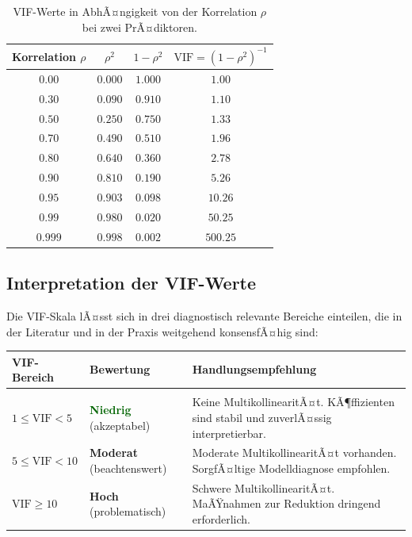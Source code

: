 ﻿\documentclass[12pt, a4paper]{article}
\theoremstyle{definition}
\theoremstyle{remark}
\begin{document}
\begin{table}[H]
	\centering
	\caption{VIF-Werte in AbhÃ¤ngigkeit von der Korrelation $\rho$ bei zwei PrÃ¤diktoren.}
	\label{tab:vif_rho}
	\begin{tabular}{cccc}
		\toprule
		Korrelation $\rho$ & $\rho^2$ & $1 - \rho^2$ & $\mathrm{VIF} = (1-\rho^2)^{-1}$ \\
		\midrule
		$0.00$ & $0.000$ & $1.000$ & $1.00$ \\
		$0.30$ & $0.090$ & $0.910$ & $1.10$ \\
		$0.50$ & $0.250$ & $0.750$ & $1.33$ \\
		$0.70$ & $0.490$ & $0.510$ & $1.96$ \\
		$0.80$ & $0.640$ & $0.360$ & $2.78$ \\
		$0.90$ & $0.810$ & $0.190$ & $5.26$ \\
		$0.95$ & $0.903$ & $0.098$ & $10.26$ \\
		$0.99$ & $0.980$ & $0.020$ & $50.25$ \\
		$0.999$ & $0.998$ & $0.002$ & $500.25$ \\
		\bottomrule
	\end{tabular}
\end{table}

\subsection{Interpretation der VIF-Werte}

Die VIF-Skala lÃ¤sst sich in drei diagnostisch relevante Bereiche einteilen, die in der
Literatur und in der Praxis weitgehend konsensfÃ¤hig sind:

\begin{tcolorbox}[thmbox, title={VIF-Klassifikationsschema}]
	\begin{tabular}{p{3cm}p{3.5cm}p{7cm}}
		\textbf{VIF-Bereich} & \textbf{Bewertung} & \textbf{Handlungsempfehlung} \\[4pt]
		\hline\\[-6pt]
		$1 \leq \mathrm{VIF} < 5$ & \textcolor{darkgreen}{\textbf{Niedrig}} (akzeptabel) & 
		Keine MultikollinearitÃ¤t. KÃ¶ffizienten sind stabil und zuverlÃ¤ssig interpretierbar. \\[6pt]
		$5 \leq \mathrm{VIF} < 10$ & \textcolor{orange!80!black}{\textbf{Moderat}} (beachtenswert) & 
		Moderate MultikollinearitÃ¤t vorhanden. SorgfÃ¤ltige Modelldiagnose empfohlen. \\[6pt]
		$\mathrm{VIF} \geq 10$ & \textcolor{accentred}{\textbf{Hoch}} (problematisch) & 
		Schwere MultikollinearitÃ¤t. MaÃŸnahmen zur Reduktion dringend erforderlich. \\
	\end{tabular}
\end{tcolorbox}
\end{document}
